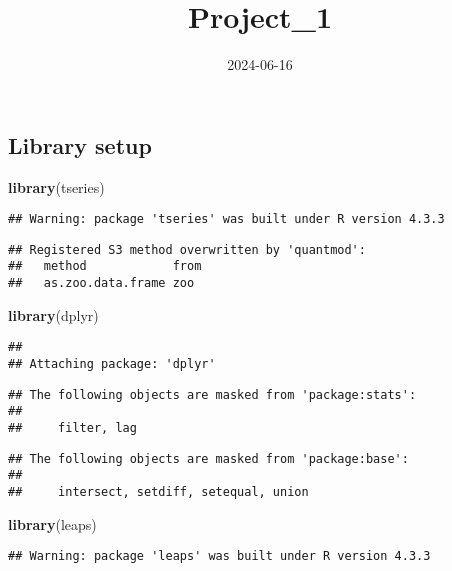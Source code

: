 \documentclass[
]{article}
\title{Project\_1}
\author{}
\date{\vspace{-2.5em}2024-06-16}
\newenvironment{Shaded}{\begin{snugshade}}{\end{snugshade}}
\newcommand{\FunctionTok}[1]{\textcolor[rgb]{0.13,0.29,0.53}{\textbf{#1}}}
\newcommand{\NormalTok}[1]{#1}
\begin{document}
\maketitle

\subsection{Library setup}\label{library-setup}

\begin{Shaded}
\begin{Highlighting}[]
\FunctionTok{library}\NormalTok{(tseries)}
\end{Highlighting}
\end{Shaded}

\begin{verbatim}
## Warning: package 'tseries' was built under R version 4.3.3
\end{verbatim}

\begin{verbatim}
## Registered S3 method overwritten by 'quantmod':
##   method            from
##   as.zoo.data.frame zoo
\end{verbatim}

\begin{Shaded}
\begin{Highlighting}[]
\FunctionTok{library}\NormalTok{(dplyr)}
\end{Highlighting}
\end{Shaded}

\begin{verbatim}
## 
## Attaching package: 'dplyr'
\end{verbatim}

\begin{verbatim}
## The following objects are masked from 'package:stats':
## 
##     filter, lag
\end{verbatim}

\begin{verbatim}
## The following objects are masked from 'package:base':
## 
##     intersect, setdiff, setequal, union
\end{verbatim}

\begin{Shaded}
\begin{Highlighting}[]
\FunctionTok{library}\NormalTok{(leaps)}
\end{Highlighting}
\end{Shaded}

\begin{verbatim}
## Warning: package 'leaps' was built under R version 4.3.3
\end{verbatim}
\end{document}
